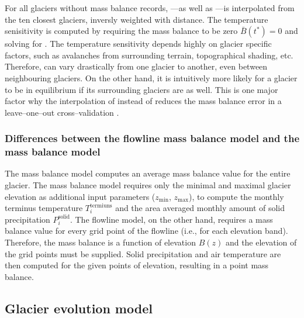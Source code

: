             For all glaciers without mass balance records, \tstar{}---as well as \bias{}---is interpolated from the ten closest glaciers, inversly weighted with distance. The temperature senisitivity is computed by requiring the mass balance to be zero $\bar B(t^*) = 0$ and solving for \mustar{}. The temperature sensitivity \mustar{} depends highly on glacier specific factors, such as avalanches from surrounding terrain, topographical shading, etc. Therefore, \mustar{} can vary drastically from one glacier to another, even between neighbouring glaciers. On the other hand, it is intuitively more likely for a glacier to be in equilibrium if its surrounding glaciers are as well. This is one major factor why the interpolation of \tstar{} instead of \mustar{} reduces the mass balance error in a leave--one--out cross--validation \citep[cf.]{Marzeion2012b, Maussion2019}.

        \subsubsection*{Differences between the flowline mass balance model and the \vas{} mass balance model}

            The \vas{} mass balance model computes an average mass balance value for the entire glacier. The mass balance model requires only the minimal and maximal glacier elevation as additional input parameters ($z_\text{min}$, $z_\text{max}$), to compute the monthly terminus temperature $T_i^\text{termiuns}$ and the area averaged monthly amount of solid precipitation $P_i^\text{solid}$. The flowline model, on the other hand, requires a mass balance value for every grid point of the flowline (i.e., for each elevation band). Therefore, the mass balance is a function of elevation $B(z)$ and the elevation of the grid points must be supplied. Solid precipitation and air temperature are then computed for the given points of elevation, resulting in a point mass balance.
    

    \subsection{Glacier evolution model} %
    \label{sub:glacier_evolution_model}

